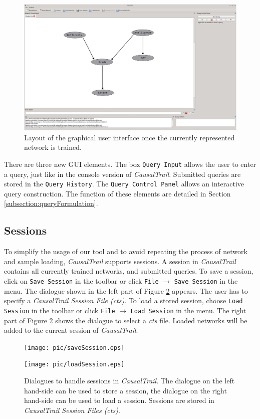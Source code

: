 \begin{figure}[H]
 \begin{center}
  \includegraphics[width=\textwidth]{pic/gui4.eps}
  \caption{Layout of the graphical user interface once the currently represented network is trained.}
  \label{figure:guiAfterTraining}
 \end{center}
\end{figure}
\noindent
There are three new GUI elements. The box \texttt{Query Input} allows the user to enter a query, just like in the console version of \textit{CausalTrail}. Submitted queries are stored in the \texttt{Query History}.
The \texttt{Query Control Panel} allows an interactive query construction. The function of these elements are detailed in Section \ref{subsection:queryFormulation}.

\subsection{Sessions}
\label{subsection:loadSessions}
To simplify the usage of our tool and to avoid repeating the process of network and sample loading, \textit{CausalTrail} supports sessions. A session in \textit{CausalTrail} contains
all currently trained networks, and submitted queries.
To save a session, click on \texttt{Save Session} in the toolbar or click \texttt{File} $\rightarrow$ \texttt{Save Session} in the menu. The dialogue shown in the left part of Figure \ref{figure:Session} appears.
The user has to specify a \textit{CausalTrail Session File (cts)}. To load a stored session, choose \texttt{Load Session} in the toolbar or click \texttt{File} $\rightarrow$ \texttt{Load Session} in the menu. 
The right part of Figure \ref{figure:Session} shows the dialogue to select a \textit{cts} file. Loaded networks will be added to the current session of \textit{CausalTrail}.
\begin{figure}[H]
\begin{minipage}{6cm}
 \texttt{[image: pic/saveSession.eps]}
\end{minipage}
%
\begin{minipage}{6cm}
 \texttt{[image: pic/loadSession.eps]}
\end{minipage}
\caption{Dialogues to handle sessions in \textit{CausalTrail}. The dialogue on the left hand-side can be used to store a session, the dialogue on the right hand-side can be used to load a session. Sessions are stored in
\textit{CausalTrail Session Files (cts)}.}
\label{figure:Session}
\end{figure}

